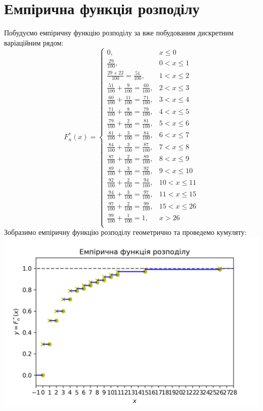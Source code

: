 \documentclass{article}
\begin{document}
\section{Емпірична функція розподілу}
Побудуємо емпіричну функцію розподілу за вже побудованим 
дискретним варіаційним рядом:
\newline
$$F_n^*(x) = \begin{cases}
  0,  & x \leq 0 \\
  \frac{29}{100}, & 0 < x \leq 1 \\
  \frac{29 + 22}{100} = \frac{51}{100}, & 1 < x \leq 2 \\
  \frac{51}{100} + \frac{9}{100} = \frac{60}{100}, & 2 < x \leq 3 \\
  \frac{60}{100} + \frac{11}{100} = \frac{71}{100}, & 3 < x \leq 4 \\
  \frac{71}{100} + \frac{8}{100} = \frac{79}{100}, & 4 < x \leq 5 \\
  \frac{79}{100} + \frac{2}{100} = \frac{81}{100}, & 5 < x \leq 6 \\
  \frac{81}{100} + \frac{3}{100} = \frac{84}{100}, & 6 < x \leq 7 \\
  \frac{84}{100} + \frac{3}{100} = \frac{87}{100}, & 7 < x \leq 8 \\
  \frac{87}{100} + \frac{2}{100} = \frac{89}{100}, & 8 < x \leq 9 \\
  \frac{89}{100} + \frac{3}{100} = \frac{92}{100}, & 9 < x \leq 10 \\
  \frac{92}{100} + \frac{2}{100} = \frac{94}{100}, & 10 < x \leq 11 \\
  \frac{94}{100} + \frac{3}{100} = \frac{97}{100}, & 11 < x \leq 15 \\
  \frac{97}{100} + \frac{2}{100} = \frac{99}{100}, & 15 < x \leq 26 \\
  \frac{99}{100} + \frac{1}{100} = 1, & x > 26 \\
\end{cases}$$
\newpage
Зобразимо емпіричну функцію розподілу геометрично та проведемо 
кумуляту:
\newline
\includegraphics[scale = 0.8]{func}
\end{document}
